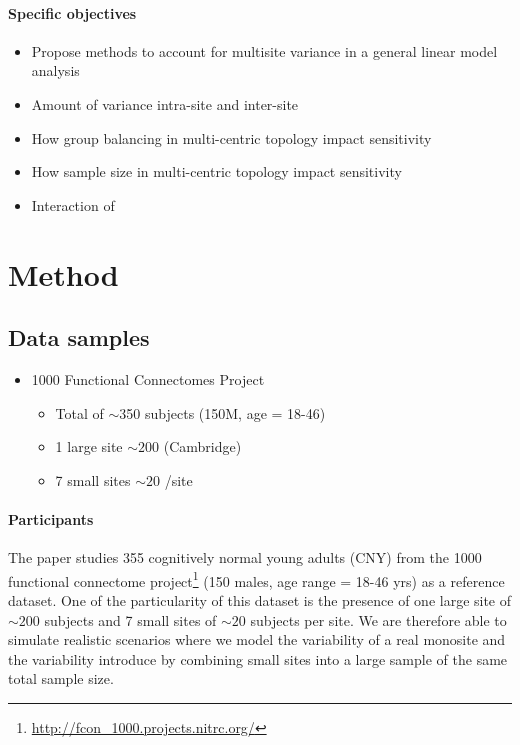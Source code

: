\documentclass[authoryear]{elsarticle}
\begin{document}
\paragraph{Specific objectives} 

\begin{itemize}
 \item Propose methods to account for multisite variance in a general linear model analysis
 \item Amount of variance intra-site and inter-site
 \item How group balancing in multi-centric topology impact sensitivity
 \item How sample size in multi-centric topology impact sensitivity
 \item Interaction of 
\end{itemize}


\section{Method}

\subsection{Data samples} 


\begin{itemize}
\item 1000 Functional Connectomes Project
\begin{itemize}
\item Total of $\sim$350 subjects (150M, age = 18-46)
\item 1 large site $\sim 200$ (Cambridge)
\item 7 small sites $\sim 20$ /site
\end{itemize}
\end{itemize}


\paragraph{Participants}
The paper studies 355 cognitively normal young adults (CNY) from the 1000 functional connectome project\footnote{\url{http://fcon_1000.projects.nitrc.org/}} (150 males, age range = 18-46 yrs) as a reference dataset. One of the particularity of this dataset is the presence of one large site of $\sim 200$ subjects and 7 small sites of $\sim 20$ subjects per site. We are therefore able to simulate realistic scenarios where we model the variability of a real monosite and the variability introduce by combining small sites into a large sample of the same total sample size.
\end{document}

